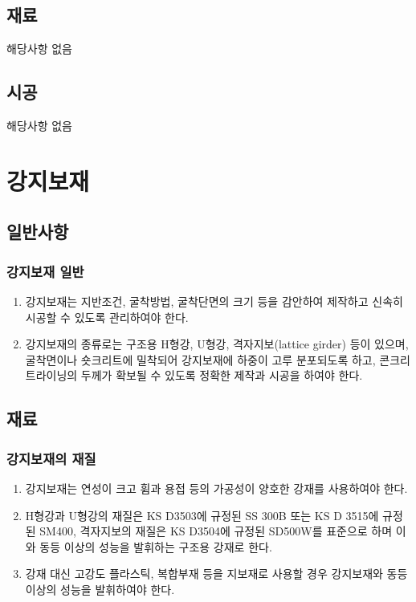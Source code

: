 \subsection{재료}
해당사항 없음  

\subsection{시공}
해당사항 없음  

%
%
%

\newpage
\section{강지보재}

\subsection{일반사항}

\subsubsection{강지보재 일반}
\begin{enumerate}
\item 강지보재는 지반조건, 굴착방법, 굴착단면의 크기 등을 감안하여 제작하고 신속히 시공할 수 있도록 관리하여야 한다.  
\item 강지보재의 종류로는 구조용 H형강, U형강, 격자지보(lattice girder) 등이 있으며, 굴착면이나 숏크리트에 밀착되어 강지보재에 하중이 고루 분포되도록 하고, 콘크리트라이닝의 두께가 확보될 수 있도록 정확한 제작과 시공을 하여야 한다.  
\end{enumerate}


\subsection{재료}

\subsubsection{강지보재의 재질}
\begin{enumerate}
\item 강지보재는 연성이 크고 휨과 용접 등의 가공성이 양호한 강재를 사용하여야 한다.  
\item H형강과 U형강의 재질은 KS D3503에 규정된 SS 300B 또는 KS D 3515에 규정된 SM400, 격자지보의 재질은 KS D3504에 규정된 SD500W를 표준으로 하며 이와 동등 이상의 성능을 발휘하는 구조용 강재로 한다.  
\item 강재 대신 고강도 플라스틱, 복합부재 등을 지보재로 사용할 경우 강지보재와 동등 이상의 성능을 발휘하여야 한다.   
\end{enumerate}

